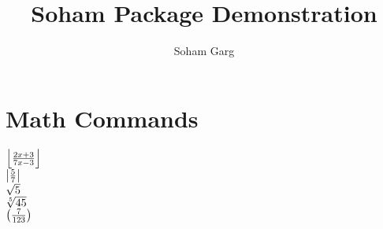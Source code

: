 \documentclass{article}
\title{Soham Package Demonstration}
\author{Soham Garg}
\begin{document}
\maketitle

\section{Math Commands}
$\left\lfloor {\frac{2x+3}{7x-3}}\right\rfloor$\\
$\left\vert {\frac{5}{7}}\right\vert$\\
$\sqrt{5}$\\
$\sqrt[5]{45}$\\
$\left(\frac{7}{123} \right)$
\end{document}
